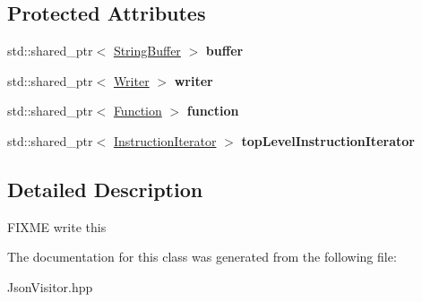 \subsection*{Protected Attributes}
\begin{DoxyCompactItemize}
\item 
\mbox{\label{a01340_a79e14ac35a004c64f3b6a5c684d73598}} 
std\+::shared\+\_\+ptr$<$ \hyperlink{a02208}{String\+Buffer} $>$ {\bfseries buffer}
\item 
\mbox{\label{a01340_a4433a92e0c5a1ede71223c275a495241}} 
std\+::shared\+\_\+ptr$<$ \hyperlink{a02228}{Writer} $>$ {\bfseries writer}
\item 
\mbox{\label{a01340_ae943110fac6aa057637fbdf76c39ba9c}} 
std\+::shared\+\_\+ptr$<$ \hyperlink{a02456}{Function} $>$ {\bfseries function}
\item 
\mbox{\label{a01340_a84ac738710890faa124c0df935bc51d5}} 
std\+::shared\+\_\+ptr$<$ \hyperlink{a02464}{Instruction\+Iterator} $>$ {\bfseries top\+Level\+Instruction\+Iterator}
\end{DoxyCompactItemize}


\subsection{Detailed Description}
F\+I\+X\+ME write this 

The documentation for this class was generated from the following file\+:\begin{DoxyCompactItemize}
\item 
Json\+Visitor.\+hpp\end{DoxyCompactItemize}

